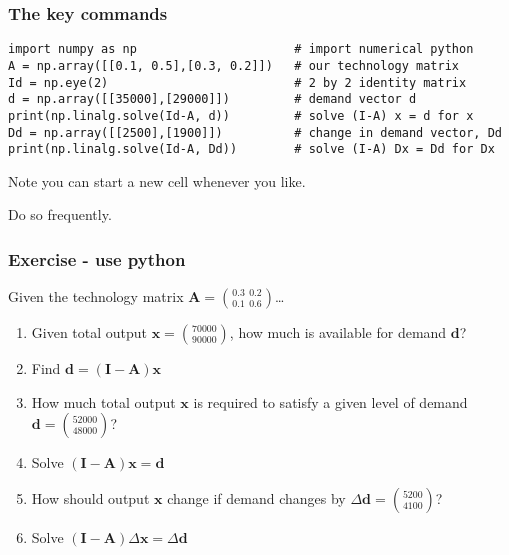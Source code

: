 \documentclass[dvips, %
               xcolor=pst,
               hyperref={colorlinks=false,
               dvips,
               citecolor=magenta,menucolor=cyan,
               bookmarks,bookmarksopen,pdfpagemode=UseThumbs}
              ]{beamer}
\renewcommand{\red}{}
\renewcommand{\blue}{}}{\newcommand{\emphy}{}}
\begin{document}
\begin{frame}[fragile]\frametitle{The key commands}

{\footnotesize\blue
\begin{verbatim}
import numpy as np                      # import numerical python
A = np.array([[0.1, 0.5],[0.3, 0.2]])   # our technology matrix
Id = np.eye(2)                          # 2 by 2 identity matrix
d = np.array([[35000],[29000]])         # demand vector d
print(np.linalg.solve(Id-A, d))         # solve (I-A) x = d for x
Dd = np.array([[2500],[1900]])          # change in demand vector, Dd
print(np.linalg.solve(Id-A, Dd))        # solve (I-A) Dx = Dd for Dx
\end{verbatim}
}

Note you can start a new cell whenever you like.

\medskip
Do so frequently.

\end{frame}

\begin{frame}[fragile]\frametitle{Exercise - use python}
Given the technology matrix $\boldsymbol{A} = {0.3\ \ 0.2 \choose 0.1\ \ 0.6}$\ldots

\bigskip

\begin{enumerate}[<+->]

\item
Given total output $\boldsymbol{x}={70000\choose 90000}$,
how much is available for demand $\boldsymbol{d}$?

\item[\ ]{\red Find  $\boldsymbol{d} = (\boldsymbol{I}-\boldsymbol{A})\boldsymbol{x}$}

\item
How much total output $\boldsymbol{x}$ is required to satisfy a given level of
demand $\boldsymbol{d} = {52000\choose 48000}$?

\item[\ ]{\red Solve  $(\boldsymbol{I}-\boldsymbol{A})\boldsymbol{x} = \boldsymbol{d}$}

\item
How should output $\boldsymbol{x}$ change if demand changes by $\Delta\boldsymbol{d}= {5200\choose 4100}$?

\item[\ ]{\red Solve  $(\boldsymbol{I}-\boldsymbol{A})\Delta\boldsymbol{x} = \Delta\boldsymbol{d}$}

\end{enumerate}

\end{frame}
\end{document}

